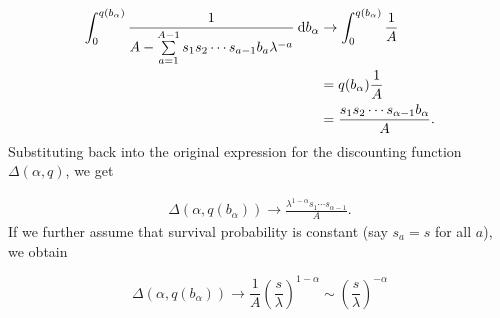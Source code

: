 \begin{align*}
    \int_0^{q(b_\alpha)} \frac{1}{A - \sum\limits_{a = 1}^{A-1}s_1s_2\cdots s_{a-1}b_a\lambda^{-a}} \:\textrm{d}b_\alpha &\to  \int_0^{q(b_\alpha)} \frac{1}{A} \\
    &= q(b_\alpha)\frac{1}{A} \\
    &=  \frac{s_1 s_2 \cdots s_{\alpha-1} b_\alpha}{A}.
\end{align*}
Substituting back into the original expression for the discounting function $\Delta(\alpha, q)$, we get

\begin{align*}
    \Delta(\alpha, q(b_\alpha)) \to \frac{\lambda^{1-\alpha}s_1 \cdots s_{\alpha-1}}{A}.
\end{align*}
If we further assume that survival probability is constant (say $s_a = s$ for all $a$), we obtain

$$ \Delta(\alpha, q(b_\alpha)) \to \frac{1}{A}\left( \frac{s}{\lambda} \right)^{1-\alpha}\sim \left( \frac{s}{\lambda} \right)^{-\alpha} $$







